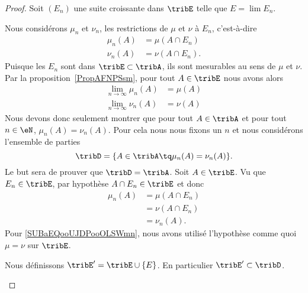 \begin{proof}
	Soit \( (E_n)\) une suite croissante dans \( \tribE\) telle que \( E=\lim E_n\).

	\begin{subproof}
		Nous considérons \( \mu_n\) et \( \nu_n\), les restrictions de \( \mu\) et \( \nu\) à \( E_n\), c'est-à-dire
		\begin{subequations}
			\begin{align}
				\mu_n(A) & =\mu(A\cap E_n)  \\
				\nu_n(A) & =\nu(A\cap E_n).
			\end{align}
		\end{subequations}
		Puisque les \( E_n\) sont dans \( \tribE\subset\tribA\), ils sont mesurables au sens de \( \mu\) et \( \nu\). Par la proposition~\ref{PropAFNPSsm}, pour tout \( A\in \tribE\) nous avons alors
		\begin{subequations}
			\begin{align}
				\lim_{n\to \infty} \mu_n(A) & =\mu(A) \\
				\lim_{n\to \infty} \nu_n(A) & =\nu(A)
			\end{align}
		\end{subequations}
		Nous devons donc seulement montrer que pour tout \( A\in\tribA\) et pour tout \( n\in\eN\), \( \mu_n(A)=\nu_n(A)\). Pour cela nous nous fixons un \( n\) et nous considérons l'ensemble de parties
		\begin{equation}
			\tribD=\{ A\in\tribA\tq\mu_n(A)=\nu_n(A) \}.
		\end{equation}
		Le but sera de prouver que \( \tribD=\tribA\).
		\spitem[\( \nu_n=\mu_n\) sur \( \tribE\)]
		Soit \( A\in \tribE\). Vu que \( E_n\in \tribE\), par hypothèse \( A\cap E_n\in\tribE\) et donc
		\begin{subequations}
			\begin{align}
				\mu_n(A) & =\mu(A\cap E_n)                                     \\
				         & =\nu(A\cap E_n)        \label{SUBaEQooUJDPooOLSWmn} \\
				         & =\nu_n(A).
			\end{align}
		\end{subequations}
		Pour \eqref{SUBaEQooUJDPooOLSWmn}, nous avons utilisé l'hypothèse comme quoi \( \mu=\nu\) sur \( \tribE\).

		Nous définissons \( \tribE'=\tribE\cup\{ E \}\). En particulier \( \tribE'\subset\tribD\).


\end{subproof}
\end{proof}
